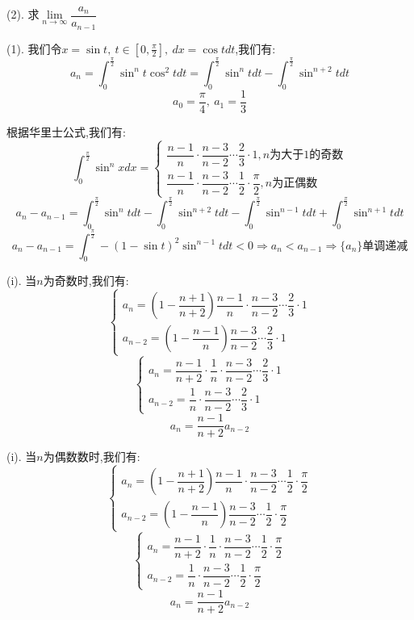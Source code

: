 (2). $\text{求}\lim\limits_{n\rightarrow \infty}\dfrac{a_{n}}{a_{n-1}}$
\begin{solution}
	
	(1).
	我们令$x=\sin t,\ t\in[0,\frac{\pi}{2}],\ dx=\cos tdt$,我们有: 
	$$a_{n}=\int_{0}^{\frac{\pi}{2}}\sin^{n}t\cos^{2} tdt=\int_{0}^{\frac{\pi}{2}}\sin^{n}tdt-\int_{0}^{\frac{\pi}{2}}\sin^{n+2}tdt$$
	$$a_{0}=\frac{\pi}{4},\ a_{1}=\frac{1}{3}$$
	
	根据华里士公式,我们有: 
	$$\int_{0}^{\frac{\pi}{2}}\sin^{n}xdx=\left\lbrace 
	\begin{array}{l}
		\dfrac{n-1}{n}\cdot\dfrac{n-3}{n-2}\cdots\dfrac{2}{3}\cdot 1,n\text{为大于1的奇数}\\
		\dfrac{n-1}{n}\cdot\dfrac{n-3}{n-2}\cdots\dfrac{1}{2}\cdot\dfrac{\pi}{2},n\text{为正偶数}
	\end{array}
	\right. $$
	$$a_{n}-a_{n-1}=\int_{0}^{\frac{\pi}{2}}\sin^{n}tdt-\int_{0}^{\frac{\pi}{2}}\sin^{n+2}tdt-\int_{0}^{\frac{\pi}{2}}\sin^{n-1}tdt+\int_{0}^{\frac{\pi}{2}}\sin^{n+1}tdt$$
	$$a_{n}-a_{n-1}=\int_{0}^{\frac{\pi}{2}}-(1-\sin t)^2\sin^{n-1}tdt<0\Rightarrow a_{n}<a_{n-1}\Rightarrow \{a_{n}\}\text{单调递减}$$
	
	(i). 当$n$为奇数时,我们有: 
	$$\left\lbrace 
	\begin{array}{l}
		a_{n}=(1-\dfrac{n+1}{n+2})\dfrac{n-1}{n}\cdot\dfrac{n-3}{n-2}\cdots\dfrac{2}{3}\cdot 1\\
		a_{n-2}=(1-\dfrac{n-1}{n})\dfrac{n-3}{n-2}\cdots\dfrac{2}{3}\cdot 1
	\end{array}
	\right. $$
	$$\left\lbrace 
	\begin{array}{l}
		a_{n}=\dfrac{n-1}{n+2}\cdot\dfrac{1}{n}\cdot\dfrac{n-3}{n-2}\cdots\dfrac{2}{3}\cdot 1\\
		a_{n-2}=\dfrac{1}{n}\cdot\dfrac{n-3}{n-2}\cdots\dfrac{2}{3}\cdot 1
	\end{array}
	\right. 
	$$
	$$a_{n}=\dfrac{n-1}{n+2}a_{n-2}$$
	
	(i). 当$n$为偶数数时,我们有: 
	$$\left\lbrace 
	\begin{array}{l}
		a_{n}=(1-\dfrac{n+1}{n+2})\dfrac{n-1}{n}\cdot\dfrac{n-3}{n-2}\cdots\dfrac{1}{2}\cdot\dfrac{\pi}{2}\\
		a_{n-2}=(1-\dfrac{n-1}{n})\dfrac{n-3}{n-2}\cdots\dfrac{1}{2}\cdot\dfrac{\pi}{2}
	\end{array}
	\right. $$
	$$\left\lbrace 
	\begin{array}{l}
		a_{n}=\dfrac{n-1}{n+2}\cdot\dfrac{1}{n}\cdot\dfrac{n-3}{n-2}\cdots\dfrac{1}{2}\cdot\dfrac{\pi}{2}\\
		a_{n-2}=\dfrac{1}{n}\cdot\dfrac{n-3}{n-2}\cdots\dfrac{1}{2}\cdot\dfrac{\pi}{2}
	\end{array}
	\right. 
	$$
	$$a_{n}=\frac{n-1}{n+2}a_{n-2}$$
	

\end{solution}
